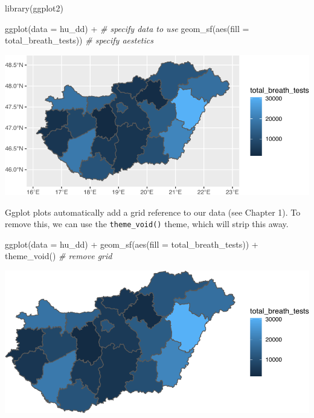 \documentclass[
]{book}
\newenvironment{Shaded}{\begin{snugshade}}{\end{snugshade}}
\newcommand{\AttributeTok}[1]{\textcolor[rgb]{0.77,0.63,0.00}{#1}}
\newcommand{\CommentTok}[1]{\textcolor[rgb]{0.56,0.35,0.01}{\textit{#1}}}
\newcommand{\FunctionTok}[1]{\textcolor[rgb]{0.00,0.00,0.00}{#1}}
\newcommand{\NormalTok}[1]{#1}
\newcommand{\SpecialCharTok}[1]{\textcolor[rgb]{0.00,0.00,0.00}{#1}}
\begin{document}
\begin{Shaded}
\begin{Highlighting}[]
\FunctionTok{library}\NormalTok{(ggplot2)}

\FunctionTok{ggplot}\NormalTok{(}\AttributeTok{data =}\NormalTok{ hu\_dd) }\SpecialCharTok{+} \CommentTok{\# specify data to use}
  \FunctionTok{geom\_sf}\NormalTok{(}\FunctionTok{aes}\NormalTok{(}\AttributeTok{fill =}\NormalTok{ total\_breath\_tests)) }\CommentTok{\# specify aestetics }
\end{Highlighting}
\end{Shaded}

\includegraphics{crime_mapping_files/figure-latex/themmap-1.pdf}

Ggplot plots automatically add a grid reference to our data (see Chapter 1). To remove this, we can use the \texttt{theme\_void()} theme, which will strip this away.

\begin{Shaded}
\begin{Highlighting}[]
\FunctionTok{ggplot}\NormalTok{(}\AttributeTok{data =}\NormalTok{ hu\_dd) }\SpecialCharTok{+} 
  \FunctionTok{geom\_sf}\NormalTok{(}\FunctionTok{aes}\NormalTok{(}\AttributeTok{fill =}\NormalTok{ total\_breath\_tests)) }\SpecialCharTok{+} 
  \FunctionTok{theme\_void}\NormalTok{()  }\CommentTok{\# remove grid }
\end{Highlighting}
\end{Shaded}

\includegraphics{crime_mapping_files/figure-latex/themmapthemevoid-1.pdf}
\end{document}
